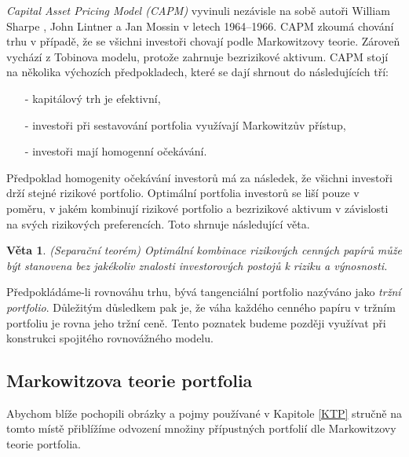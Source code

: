 \documentclass[a4paper,12pt]{report}
\newtheorem{veta}{Věta}
\theoremstyle{definition} \newtheorem{definice}[veta]{Definice}
\theoremstyle{remark}
\begin{document}
\textit{Capital Asset Pricing Model (CAPM)} vyvinuli nezávisle na sobě autoři William Sharpe \cite{sharpe1964}, John Lintner \cite{lintner1965} a Jan Mossin \cite{mossin1966} v letech 1964--1966. CAPM zkoumá chování trhu v případě, že se všichni investoři chovají podle Markowitzovy teorie.
Zároveň vychází z Tobinova modelu, protože zahrnuje bezrizikové aktivum.
CAPM stojí na několika výchozích předpokladech, které se dají shrnout do následujících tří:
\begin{itemize}
\item[-] kapitálový trh je efektivní,
\item[-] investoři při sestavování portfolia využívají Markowitzův přístup,
\item[-] investoři mají homogenní očekávání.
\end{itemize}
Předpoklad homogenity očekávání investorů má za následek, že všichni investoři drží stejné rizikové portfolio.
Optimální portfolia investorů se liší pouze v poměru, v jakém kombinují rizikové portfolio a bezrizikové aktivum v závislosti na svých rizikových preferencích.
Toto shrnuje následující věta.

\begin{veta}(Separační teorém)
Optimální kombinace rizikových cenných papírů může být stanovena bez jakékoliv znalosti investorových postojů k riziku a výnosnosti.
\end{veta}

Předpokládáme-li rovnováhu trhu, bývá tangenciální portfolio nazýváno jako \textit{tržní portfolio}.
Důležitým důsledkem pak je, že váha každého cenného papíru v tržním portfoliu je rovna jeho tržní ceně. \label{vahy_trznihodnota}
Tento poznatek budeme později využívat při konstrukci spojitého rovnovážného modelu.

\subsection{Markowitzova teorie portfolia}\label{Markowitz_kap}
Abychom blíže pochopili obrázky a pojmy používané v Kapitole \ref{KTP} stručně na tomto místě přiblížíme odvození množiny přípustných portfolií  dle Markowitzovy teorie portfolia.
\end{document}
